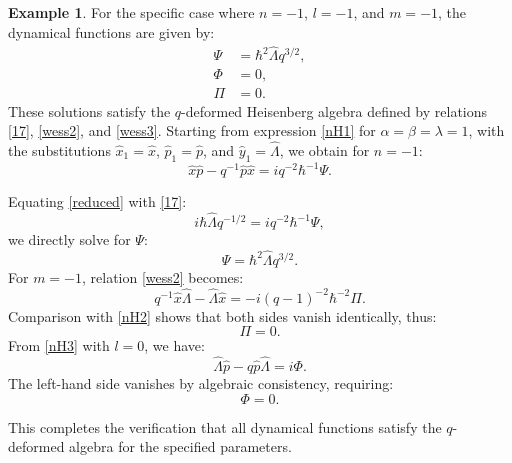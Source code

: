 \documentclass[12pt,a4paper]{article}
\theoremstyle{plain}
\theoremstyle{definition}
\newtheorem{example}[theorem]{Example}
\theoremstyle{remark}
\begin{document}
\begin{example}
For the specific case where \( n = -1 \), \( l = -1 \), and \( m = -1 \), the dynamical functions are given by:
\begin{align*}
\Psi &= \hbar^{2}\hat{\Lambda}q^{3/2}, \\
\Phi &= 0, \\
\Pi &= 0.
\end{align*}
These solutions satisfy the $q$-deformed Heisenberg algebra defined by relations \eqref{17}, \eqref{wess2}, and \eqref{wess3}. Starting from expression \eqref{nH1} for $\alpha = \beta = \lambda = 1$, with the substitutions \( \hat{x}_{1}=\hat{x}\), \( \hat{p}_{1}= \hat{p} \), and \( \hat{y}_{1}=\hat{\Lambda} \), we obtain for \( n = -1 \):
\begin{equation}\label{reduced}
\hat{x}\hat{p} - q^{-1}\hat{p}\hat{x} = iq^{-2}\hbar^{-1}\Psi.
\end{equation}

Equating \eqref{reduced} with \eqref{17}:
\begin{equation*}
i\hbar\hat{\Lambda}q^{-1/2} = iq^{-2}\hbar^{-1}\Psi,
\end{equation*}
we directly solve for $\Psi$:
\begin{equation*}
\Psi = \hbar^{2}\hat{\Lambda}q^{3/2}.
\end{equation*}
For \( m = -1 \), relation \eqref{wess2} becomes:
\begin{equation*}
q^{-1}\hat{x}\hat{\Lambda} - \hat{\Lambda}\hat{x} = -i(q-1)^{-2}\hbar^{-2}\Pi.
\end{equation*}
Comparison with \eqref{nH2} shows that both sides vanish identically, thus:
\begin{equation*}
\Pi = 0.
\end{equation*}
From \eqref{nH3} with \( l = 0 \), we have:
\begin{equation*}
\hat{\Lambda}\hat{p} - q\hat{p}\hat{\Lambda} = i\Phi.
\end{equation*}
The left-hand side vanishes by algebraic consistency, requiring:
\begin{equation*}
\Phi = 0.
\end{equation*}

This completes the verification that all dynamical functions satisfy the $q$-deformed algebra for the specified parameters.
\end{example}
\end{document}
